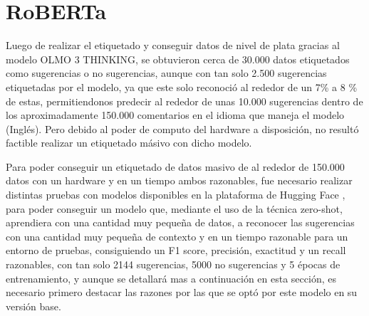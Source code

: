 



\section{RoBERTa}
\label{sec:RoBERTa}

Luego de realizar el etiquetado y conseguir datos de nivel de plata gracias al modelo OLMO 3 THINKING, se obtuvieron cerca de 30.000 datos etiquetados como sugerencias o no sugerencias, aunque con tan solo 2.500 sugerencias etiquetadas por el modelo, ya que este solo reconoció al rededor de un 7\% a 8 \% de estas, permitiendonos predecir al rededor de unas 10.000 sugerencias dentro de los aproximadamente 150.000 comentarios en el idioma que maneja el modelo (Inglés). Pero debido al poder de computo del hardware a disposición, no resultó factible realizar un etiquetado másivo con dicho modelo.

Para poder conseguir un etiquetado de datos masivo de al rededor de 150.000 datos con un hardware y en un tiempo ambos razonables, fue necesario realizar distintas pruebas con modelos disponibles en la plataforma de Hugging Face \cite{hf_roberta}, para poder conseguir un modelo que, mediante el uso de la técnica zero-shot, aprendiera con una cantidad muy pequeña de datos, a reconocer las sugerencias con una cantidad muy pequeña de contexto y en un tiempo razonable para un entorno de pruebas, consiguiendo un F1 score, precisión, exactitud y un recall razonables, con tan solo 2144 sugerencias, 5000 no sugerencias y 5 épocas de entrenamiento, y aunque se detallará mas a continuación en esta sección, es necesario primero destacar las razones por las que se optó por este modelo en su versión base.

